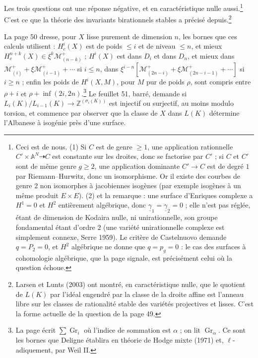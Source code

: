 \documentclass[11pt,a4paper]{article}
\begin{document}
Les trois questions ont une réponse négative, et en caractéristique nulle
aussi.\footnote{Ceci est de nous. (1) Si $C$ est de genre $\geqslant 1$, une
application rationnelle $C' \times \mathbb{A}^{N} \dashrightarrow C$ est
constante sur les droites, donc se factorise par $C'$ ; si $C$ et $C'$ sont de
même genre $g \geqslant 2$, une application dominante $C' \to C$ est de degré $1$
par Riemann--Hurwitz, donc un isomorphisme. Or il existe des courbes de genre $2$
non isomorphes à jacobiennes isogènes (par exemple isogènes à un même produit
$E \times E$). (2) et la remarque : une surface d'Enriques complexe a $H^{1} = 0$
et $H^{2}$ entièrement algébrique, donc $\underline{\gamma}_{1} = \underline{\gamma}_{2} = 0$ ; elle n'est
pas réglée, étant de dimension de Kodaira nulle, ni unirationnelle, son groupe
fondamental étant d'ordre $2$ (une variété unirationnelle complexe est
simplement connexe, Serre 1959). Le critère de Castelnuovo demande $q = P_{2} =
0$, et $H^{2}$ algébrique ne donne que $q = p_{g} = 0$ : le cas des surfaces à
cohomologie algébrique, que la page signale, est précisément celui où la
question échoue.} C'est ce que la théorie des invariants birationnels
stables a précisé depuis.\footnote{Larsen et Lunts (2003) ont montré, en
caractéristique nulle, que le quotient de $L(K)$ par l'idéal engendré par la
classe de la droite affine est l'anneau libre sur les classes de rationalité
stable des variétés projectives et lisses. C'est la forme actuelle de la question
de la page 49.}

La page 50 dresse, pour $X$ lisse purement de dimension $n$, les bornes que ces
calculs utilisent : $H^{i}_{c}(X)$ est de poids $\leqslant i$ et de niveau
$\leqslant n$, et mieux $H^{n+k}_{c}(X) \in \xi^{k}\mathcal{M}^{+}_{(n-k)}$ ;
$H^{i}(X)$ est dans $D_{i}$ et dans $D_{n}$, et mieux dans $\mathcal{M}^{+}_{(i)} +
\xi\mathcal{M}^{+}_{(i-1)} + \cdots$ si $i \leqslant n$, dans
$\xi^{i-n}[\mathcal{M}^{+}_{(2n-i)} + \xi\mathcal{M}^{+}_{(2n-i-1)} + \cdots]$ si
$i \geqslant n$ ; enfin les poids de $H^{i}(X, M)$, pour $M$ pur de poids $\rho$,
sont compris entre $\rho + i$ et $\rho + \inf(2i, 2n)$.\footnote{La page écrit
$\sum \operatorname{Gr}_{i}$ où l'indice de sommation est $\alpha$ ; on lit
$\operatorname{Gr}_{\alpha}$. Ce sont les bornes que Deligne établira en théorie de
Hodge mixte (1971) et, $\ell$-adiquement, par Weil II.} Le feuillet 51, barré,
demande si $L_{i}(K)/L_{i-1}(K) \to \mathbb{Z}^{(\sigma_{i}(K))}$ est injectif ou
surjectif, au moins modulo torsion, et commence par observer que la classe de
$X$ dans $L(K)$ détermine l'Albanese à isogénie près d'une surface.
\end{document}
